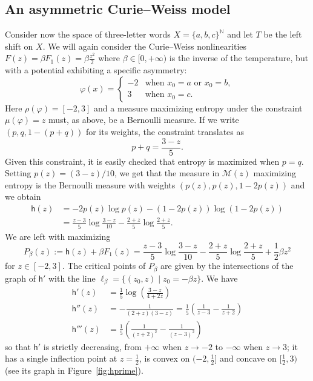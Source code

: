 \documentclass[10pt]{amsart}
\theoremstyle{definition}\newtheorem{defi}[theo]{Definition}\newtheorem{rema}[theo]{Remark}\newtheorem{exam}[theo]{Example}\newtheorem{exem}[theo]{Example}\newtheorem{nota}[theo]{Notation}
\theoremstyle{plain}
\theoremstyle{plain}
\newcommand{\hf}{\mathsf{h}}
\newcommand{\pot}{\varphi}
\newcommand*\8{\infty}
\newcommand\NN{\mathbb{N}}
\newcommand{\cM}{\mathcal{M}}
\begin{document}
\subsection{An asymmetric Curie--Weiss model}\label{sec-metastable}

Consider now the space of three-letter words $X=\{a,b,c\}^{\NN}$ and let $T$ be the left shift on $X$. We will again consider the Curie--Weiss nonlinearities $F(z) = \beta F_1(z) = \beta\frac{z^2}{2}$ where $\beta\in[0,+\infty)$ is the inverse of the temperature, but with a potential exhibiting a specific asymmetry:
\[
\pot(x) =
\begin{cases}
-2 &\text{when }x_0=a \text{ or }x_0=b,\\
3 &\text{when }x_0=c.
\end{cases}
\]
Here $\rho(\pot)=[-2,3]$ and a measure maximizing entropy under the constraint $\mu(\pot)=z$ must, as above, be a Bernoulli measure. If we write $(p,q,1-(p+q))$ for its weights, the constraint translates as
\begin{equation}
p+q = \frac{3-z}{5}.
\end{equation}
Given this constraint, it is easily checked that entropy is maximized when $p=q$. Setting $p(z) = (3-z)/10$, we get that the measure in $\cM(z)$ maximizing entropy is the Bernoulli measure with weights $(p(z),p(z),1-2p(z))$ and we obtain
\begin{align*}
\hf(z) &= -2p(z)\log p(z)-(1-2p(z))\log(1-2p(z)) \\
&= \frac{z-3}{5} \log\frac{3-z}{10}-\frac{2+z}{5}\log \frac{2+z}{5}.
\end{align*}
We are left with maximizing
\[
P_\beta(z) := \hf(z)+\beta F_1(z) = \frac{z-3}{5} \log\frac{3-z}{10}-\frac{2+z}{5}\log \frac{2+z}{5} +\frac12\beta z^2
\]
for $z\in[-2,3]$. The critical points of $P_\beta$ are given by the intersections of the graph of $\hf'$ with the line $\ell_\beta=\{(z_0,z)\mid z_0=-\beta z\}$. We have
\begin{align*}
\hf'(z) &= \frac{1}{5} \log\left(\frac{3-z}{4+2z} \right) \\
\hf''(z) &= -\frac{1}{(2+z)(3-z)} = \frac15\left(\frac{1}{z-3} -\frac{1}{z+2} \right) \\
\hf'''(z) &= \frac15\left(\frac{1}{(z+2)^2} -\frac{1}{(z-3)^2} \right)
\end{align*}
so that $\hf'$ is strictly decreasing, from $+\infty$ when $z\to-2$ to $-\infty$ when $z\to 3$; it has a single inflection point at $z=\frac12$, is convex on $(-2,\frac12]$ and concave on $[\frac12,3)$ (see its graph in Figure~\ref{fig:hprime}).
\end{document}
